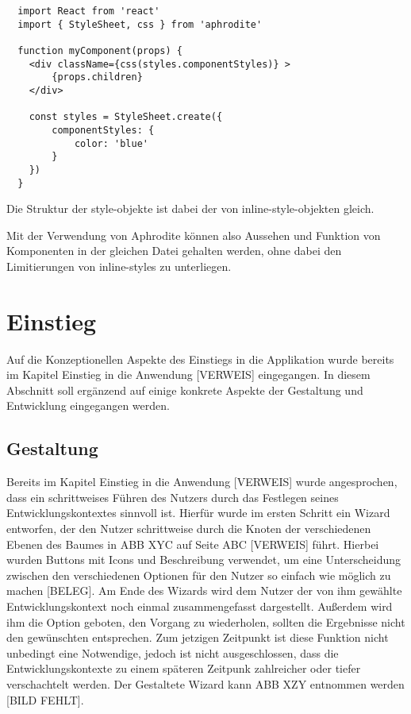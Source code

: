 \begin{lstlisting}
  import React from 'react'
  import { StyleSheet, css } from 'aphrodite'

  function myComponent(props) {
  	<div className={css(styles.componentStyles)} >
  		{props.children}
  	</div>

  	const styles = StyleSheet.create({
  		componentStyles: {
  			color: 'blue'
  		}
  	})
  }
\end{lstlisting}

Die Struktur der style-objekte ist dabei der von inline-style-objekten gleich.

Mit der Verwendung von Aphrodite können also Aussehen und Funktion von Komponenten in der gleichen Datei gehalten werden, ohne dabei den Limitierungen von inline-styles zu unterliegen.

\section{Einstieg}
Auf die Konzeptionellen Aspekte des Einstiegs in die Applikation wurde bereits im Kapitel Einstieg in die Anwendung [VERWEIS] eingegangen. In diesem Abschnitt soll ergänzend  auf einige konkrete Aspekte der Gestaltung und Entwicklung eingegangen werden.

\subsection{Gestaltung}
Bereits im Kapitel Einstieg in die Anwendung [VERWEIS] wurde angesprochen, dass ein schrittweises Führen des Nutzers durch das Festlegen seines Entwicklungskontextes sinnvoll ist.
Hierfür wurde im ersten Schritt ein Wizard entworfen, der den Nutzer schrittweise durch die Knoten der verschiedenen Ebenen des Baumes in ABB XYC auf Seite ABC [VERWEIS]  führt.
Hierbei wurden Buttons mit Icons und Beschreibung verwendet, um eine Unterscheidung zwischen den verschiedenen Optionen für den Nutzer so einfach wie möglich zu machen [BELEG].
Am Ende des Wizards wird dem Nutzer der von ihm gewählte Entwicklungskontext noch einmal zusammengefasst dargestellt. Außerdem wird ihm die Option geboten, den Vorgang zu wiederholen, sollten die Ergebnisse nicht den gewünschten entsprechen.  Zum jetzigen Zeitpunkt ist  diese Funktion nicht unbedingt eine Notwendige, jedoch ist nicht ausgeschlossen, dass die Entwicklungskontexte zu einem späteren Zeitpunk zahlreicher oder tiefer verschachtelt werden.
Der Gestaltete Wizard kann ABB XZY entnommen werden [BILD FEHLT].

